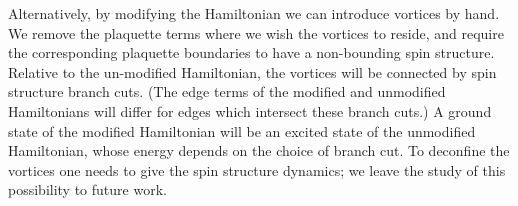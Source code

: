 
Alternatively, by modifying the Hamiltonian we can introduce vortices by hand. 
We remove the plaquette terms where we wish the vortices to reside, 
and require the corresponding plaquette boundaries
to have a non-bounding spin structure.
Relative to the un-modified Hamiltonian, 
the vortices will be connected by spin structure branch cuts.
(The edge terms of the modified and unmodified Hamiltonians will differ for edges which intersect these branch cuts.)
A ground state of the modified Hamiltonian will be an excited state of the unmodified Hamiltonian, 
whose energy depends on the choice of branch cut.
To deconfine the vortices one needs to give the spin structure dynamics; 
we leave the study of this possibility to future work.


